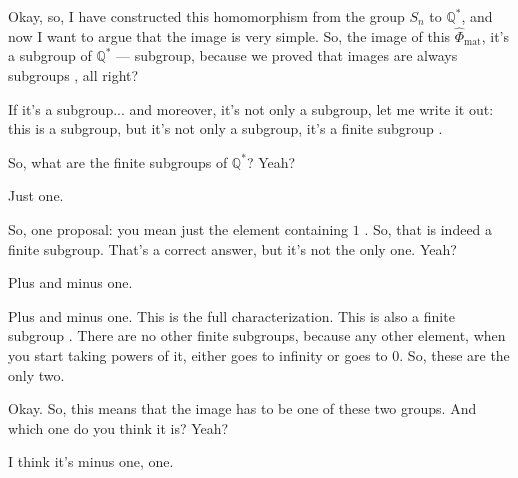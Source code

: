 \begin{speech}[00:20:47 - 00:21:33]
Okay, so, I have constructed this homomorphism from the group $S_n$ to $\mathbb{Q}^*$, and now I want to argue that the image is very simple. So, the image of this $\hat{\Phi}_{\text{mat}}$, it's a subgroup of $\mathbb{Q}^*$ --- subgroup, because we proved that images are always subgroups , all right?

If it's a subgroup... and moreover, it's not only a subgroup, let me write it out: this is a subgroup, but it's not only a subgroup, it's a finite subgroup .

So, what are the finite subgroups of $\mathbb{Q}^*$? Yeah?
\end{speech}

\begin{student}
Just one.
\end{student}

\begin{speech}[00:21:35 - 00:21:51]
So, one proposal: you mean just the element containing $1$ . So, that is indeed a finite subgroup. That's a correct answer, but it's not the only one. Yeah?
\end{speech}

\begin{student}
Plus and minus one.
\end{student}

\begin{speech}[00:21:52 - 00:22:17]
Plus and minus one. This is the full characterization. This is also a finite subgroup . There are no other finite subgroups, because any other element, when you start taking powers of it, either goes to infinity or goes to $0$. So, these are the only two.

Okay. So, this means that the image has to be one of these two groups. And which one do you think it is? Yeah?
\end{speech}

\begin{student}
I think it's minus one, one.
\end{student}

